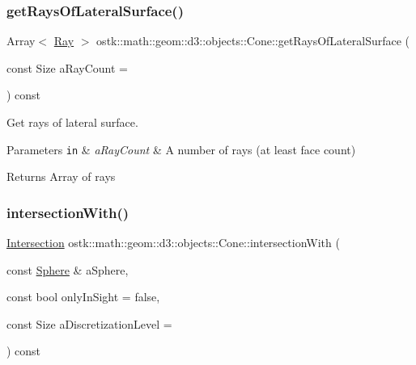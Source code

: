 \subsubsection{\texorpdfstring{get\+Rays\+Of\+Lateral\+Surface()}{getRaysOfLateralSurface()}}
{\footnotesize\ttfamily Array$<$ \hyperlink{classostk_1_1math_1_1geom_1_1d3_1_1objects_1_1_ray}{Ray} $>$ ostk\+::math\+::geom\+::d3\+::objects\+::\+Cone\+::get\+Rays\+Of\+Lateral\+Surface (\begin{DoxyParamCaption}\item[{const Size}]{a\+Ray\+Count = {} }\end{DoxyParamCaption}) const}



Get rays of lateral surface. 


\begin{DoxyParams}[1]{Parameters}
\mbox{\tt in}  & {\em a\+Ray\+Count} & A number of rays (at least face count) \\
\hline
\end{DoxyParams}
\begin{DoxyReturn}{Returns}
Array of rays 
\end{DoxyReturn}
\mbox{\label{classostk_1_1math_1_1geom_1_1d3_1_1objects_1_1_cone_abaef843007b64e1a2c5b126bdcb650d8}} 
\subsubsection{\texorpdfstring{intersection\+With()}{intersectionWith()}\hspace{0.1cm}{\footnotesize\ttfamily [1/2]}}
{\footnotesize\ttfamily \hyperlink{classostk_1_1math_1_1geom_1_1d3_1_1_intersection}{Intersection} ostk\+::math\+::geom\+::d3\+::objects\+::\+Cone\+::intersection\+With (\begin{DoxyParamCaption}\item[{const \hyperlink{classostk_1_1math_1_1geom_1_1d3_1_1objects_1_1_sphere}{Sphere} \&}]{a\+Sphere,  }\item[{const bool}]{only\+In\+Sight = {\ttfamily false},  }\item[{const Size}]{a\+Discretization\+Level = {} }\end{DoxyParamCaption}) const}



